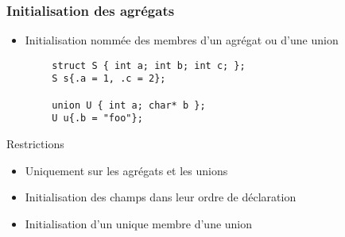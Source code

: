 \documentclass[C++.tex]{subfiles}
\begin{document}
\begin{frame}[fragile]
	\frametitle{Initialisation des agrégats}
	\begin{itemize}
		\item Initialisation nommée des membres d'un agrégat ou d'une union
	\end{itemize}

	\begin{verbatim}
		struct S { int a; int b; int c; };
		S s{.a = 1, .c = 2};

		union U { int a; char* b };
		U u{.b = "foo"};
	\end{verbatim}

	\begin{alertblock}{Restrictions}
		\begin{itemize}
			\item Uniquement sur les agrégats et les unions
			\item Initialisation des champs dans leur ordre de déclaration
			\item Initialisation d'un unique membre d'une union

		\end{itemize}
	\end{alertblock}


\end{frame}
\end{document}
